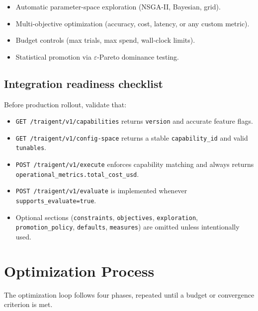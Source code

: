 \documentclass[11pt,a4paper]{article}
\newcommand{\field}[1]{\texttt{#1}}
\begin{document}
\begin{itemize}[nosep]
  \item Automatic parameter-space exploration (NSGA-II, Bayesian, grid).
  \item Multi-objective optimization (accuracy, cost, latency, or any custom metric).
  \item Budget controls (max trials, max spend, wall-clock limits).
  \item Statistical promotion via $\varepsilon$-Pareto dominance testing.
\end{itemize}

\subsection{Integration readiness checklist}

Before production rollout, validate that:

\begin{itemize}[nosep]
  \item \texttt{GET /traigent/v1/capabilities} returns \field{version} and accurate feature flags.
  \item \texttt{GET /traigent/v1/config-space} returns a stable \field{capability\_id} and valid \field{tunables}.
  \item \texttt{POST /traigent/v1/execute} enforces capability matching and always returns \field{operational\_metrics.total\_cost\_usd}.
  \item \texttt{POST /traigent/v1/evaluate} is implemented whenever \field{supports\_evaluate=true}.
  \item Optional sections (\field{constraints}, \field{objectives}, \field{exploration}, \field{promotion\_policy}, \field{defaults}, \field{measures}) are omitted unless intentionally used.
\end{itemize}

\section{Optimization Process}

The optimization loop follows four phases, repeated until a budget or
convergence criterion is met.
\end{document}
